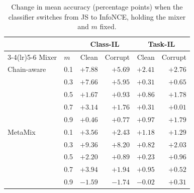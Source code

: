 \begin{table}[H]
\centering\footnotesize\setlength{\tabcolsep}{3pt}
\begin{tabular}{llrrrr}
\toprule
 & & \multicolumn{2}{c}{Class-IL} & \multicolumn{2}{c}{Task-IL} \\
\cmidrule(lr){3-4}\cmidrule(lr){5-6}
Mixer & $m$ & Clean & Corrupt & Clean & Corrupt \\
\midrule
Chain-aware & 0.1 & $+7.88$ & $+5.69$ & $+2.41$ & $+2.76$ \\
 & 0.3 & $+7.66$ & $+5.95$ & $+0.31$ & $+0.65$ \\
 & 0.5 & $+1.67$ & $+0.93$ & $+0.86$ & $+1.78$ \\
 & 0.7 & $+3.14$ & $+1.76$ & $+0.31$ & $+0.01$ \\
 & 0.9 & $+0.46$ & $+0.77$ & $+0.97$ & $+1.79$ \\
\midrule
MetaMix & 0.1 & $+3.56$ & $+2.43$ & $+1.18$ & $+1.29$ \\
 & 0.3 & $+9.36$ & $+8.20$ & $+0.82$ & $+2.03$ \\
 & 0.5 & $+2.20$ & $+0.89$ & $+0.23$ & $+0.96$ \\
 & 0.7 & $+3.94$ & $+1.94$ & $+0.95$ & $+0.52$ \\
 & 0.9 & $-1.59$ & $-1.74$ & $-0.02$ & $+0.31$ \\
\bottomrule
\end{tabular}
\caption{Change in mean accuracy (percentage points) when the classifier switches from JS to InfoNCE, holding the mixer and $m$ fixed.}\label{tab:delta}
\end{table}
